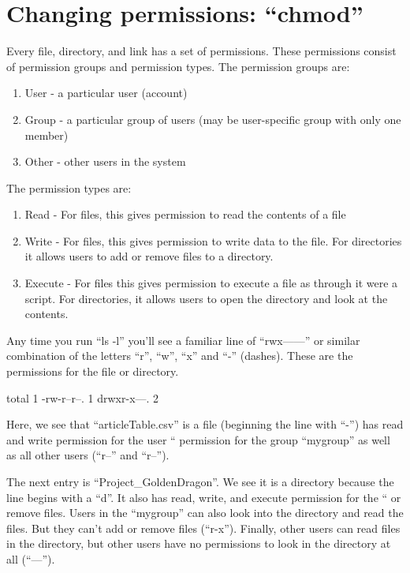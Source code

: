 \section{Changing permissions: ``chmod''}

Every file, directory, and link has a set of permissions. These permissions
consist of permission groups and permission types. The permission groups are: 

\begin{enumerate}
\item User - a particular user (account)
\item Group - a particular group of users (may be user-specific group with only one member)
\item Other - other users in the system
\end{enumerate}

The permission types are:

\begin{enumerate}
\item Read - For files, this gives permission to read the contents of a file
\item Write - For files, this gives permission to write data to the file. For directories it allows users to add or remove files to a directory.
\item Execute - For files this gives permission to execute a file as through it were a script. For directories, it allows users to open the directory and look at the contents.
\end{enumerate}

Any time you run ``ls -l'' you'll see a familiar line of ``rwx------'' or similar combination of the letters ``r'', ``w'', ``x'' and ``-'' (dashes). These are the permissions for the file or directory.

\begin{prompt}
total 1
-rw-r--r--. 1 %
drwxr-x---. 2 %
\end{prompt}

Here, we see that ``articleTable.csv'' is a file (beginning the line with ``-'')
has read and write permission for the user ``%
permission for the group ``mygroup'' as well as all other users (``r--'' and
``r--'').

The next entry is ``Project\_GoldenDragon''. We see it is a directory because the
line begins with a ``d''. It also has read, write, and execute permission for
the ``%
or remove files. Users in the ``mygroup'' can also look into the directory and
read the files. But they can't add or remove files (``r-x''). Finally, other
users can read files in the directory, but other users have no permissions to
look in the directory at all (``---'').

